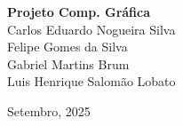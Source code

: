 \documentclass[12pt,a4paper]{article}
\begin{document}
\begin{titlepage}
	\begin{center}
	
	\vspace{115pt}
    \textbf{\Huge{Projeto Comp. Gráfica}}\\
        
	\vspace{115pt}
    Carlos Eduardo Nogueira Silva \\
    Felipe Gomes da Silva \\
    Gabriel Martins Brum \\
    Luis Henrique Salomão Lobato \\
	\end{center}
	
	\vspace{1cm}
	\begin{center}
		\vspace{\fill}
    \large{Setembro, 2025} 
	\end{center}
\end{titlepage}

\tableofcontents
\newpage














\end{document}
